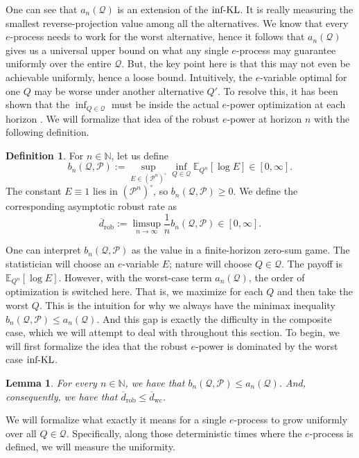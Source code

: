 \documentclass[11pt]{article}
\newcommand{\infKL}{\textnormal{inf-KL}}
\newcommand{\E}{\mathbb{E}}
\newcommand{\Pcal}{\mathcal{P}}
\newcommand{\Qcal}{\mathcal{Q}}
\newtheorem{lemma}[theorem]{Lemma}
\theoremstyle{definition}
\newtheorem{definition}[theorem]{Definition}
\theoremstyle{definition}
\begin{document}
One can see that $a_n(\Qcal)$ is an extension of the $\infKL$. It is really measuring the smallest reverse-projection value among all the alternatives. We know that every $e$-process needs to work for the worst alternative, hence it follows that $a_n(\Qcal)$ gives us a universal upper bound on what any single $e$-process may guarantee uniformly over the entire $\Qcal$. But, the key point here is that this may not even be achievable uniformly, hence a loose bound. Intuitively, the $e$-variable optimal for one $Q$ may be worse under another alternative $Q'$. To resolve this, it has been shown that the $\inf_{Q\in\Qcal}$ must be inside the actual $e$-power optimization at each horizon \parencite{grunwald2024}. We will formalize that idea of the robust $e$-power at horizon $n$ with the following definition.

\begin{definition}\label{def:bn-robust-epower}
For $n\in\mathbb N$, let us define
\[
b_n(\Qcal,\Pcal):=\sup_{E\in(\Pcal^n)^\circ}\inf_{Q\in\Qcal} \E_{Q^n}[\log E]\in[0,\infty].
\]
The constant $E\equiv 1$ lies in $(\Pcal^n)^{\circ}$, so $b_n(\Qcal,\Pcal)\ge 0$. We define the corresponding asymptotic robust rate as
\[
\overline d_{\mathrm{rob}}:=\limsup_{n\to\infty}\frac{1}{n}b_n(\Qcal,\Pcal)\in[0,\infty].
\]
\end{definition}

One can interpret $b_n(\Qcal,\Pcal)$ as the value in a finite-horizon zero-sum game. The statistician will choose an $e$-variable $E$; nature will choose $Q\in\Qcal$. The payoff is $\E_{Q^n}[\log E]$. However, with the worst-case term $a_n(\Qcal)$, the order of optimization is switched here. That is, we maximize for each $Q$ and then take the worst $Q$. This is the intuition for why we always have the minimax inequality $b_n(\Qcal,\Pcal)\le a_n(\Qcal)$. And this gap is exactly the difficulty in the composite case, which we will attempt to deal with throughout this section. To begin, we will first formalize the idea that the robust $e$-power is dominated by the worst case $\infKL$.

\begin{lemma}\label{lem:bn-le-an}
For every $n\in\mathbb N$, we have that $b_n(\Qcal,\Pcal)\le a_n(\Qcal)$. And, consequently, we have that $\overline d_{\mathrm{rob}}\le \overline d_{\mathrm{wc}}$.    
\end{lemma}

We will formalize what exactly it means for a single $e$-process to grow uniformly over all $Q\in\Qcal$. Specifically, along those deterministic times where the $e$-process is defined, we will measure the uniformity.
\end{document}

